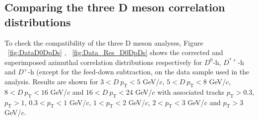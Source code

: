 \label{results}
\subsection{Comparing the three D meson correlation distributions}
To check the compatibility of the three D meson analyses, Figure ~\ref{fig:DataD0DpDs} , ~\ref{fig:Data_Res_D0DpDs} shows the corrected and superimposed azimuthal correlation distributions respectively for $D^0$-h, $D^{*+}$-h and $D^+$-h (except for the feed-down subtraction, on the data sample used in the analysis. Results are shown for $3 < D\ p_\text{T} < 5$ GeV/$c$, $5 < D\ p_\text{T} < 8$ GeV/$c$, $8 < D \ p_\text{T} < 16$ GeV/$c$ and $16 < D\ p_\text{T} < 24$ GeV/$c$ with associated tracks $p_\text{T} > 0.3$, $p_\text{T} > 1$, $0.3 < p_\text{T} < 1$ GeV/$c$, $1 < p_\text{T} < 2$ GeV/$c$, $2 < p_\text{T} < 3$ GeV/$c$ and $ p_\text{T} > 3$ GeV/$c$.

